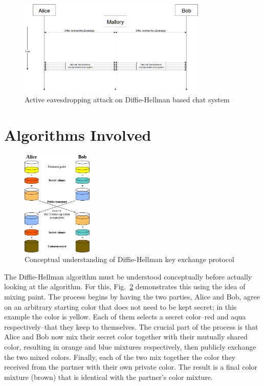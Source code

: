 \documentclass[12pt,a4paper]{article}
\begin{document}
\begin{figure}[h]
	\centering
	\vspace{0.5cm}
	\includegraphics[width=0.8\textwidth]{pictures/mitm-mallory}
	\vspace{0.5cm}
	\caption{Active eavesdropping attack on Diffie-Hellman based chat system}
	\label{fig:mallory}
\end{figure}

\section{Algorithms Involved}
\label{sec:algo}

\begin{figure}
	\centering
	\vspace{0.5cm}
	\includegraphics[width=0.3\textwidth]{pictures/paint}
	\vspace{0.5cm}
	\caption{Conceptual understanding of Diffie-Hellman key exchange protocol}
	\label{fig:paint}
\end{figure}

The Diffie-Hellman algorithm must be understood conceptually before actually looking at the algorithm. For this, Fig.~\ref{fig:paint} demonstrates this using the idea of mixing paint. The process begins by having the two parties, Alice and Bob, agree on an arbitrary starting color that does not need to be kept secret; in this example the color is yellow. Each of them selects a secret color–red and aqua respectively–that they keep to themselves. The crucial part of the process is that Alice and Bob now mix their secret color together with their mutually shared color, resulting in orange and blue mixtures respectively, then publicly exchange the two mixed colors. Finally, each of the two mix together the color they received from the partner with their own private color. The result is a final color mixture (brown) that is identical with the partner's color mixture.
\end{document}
